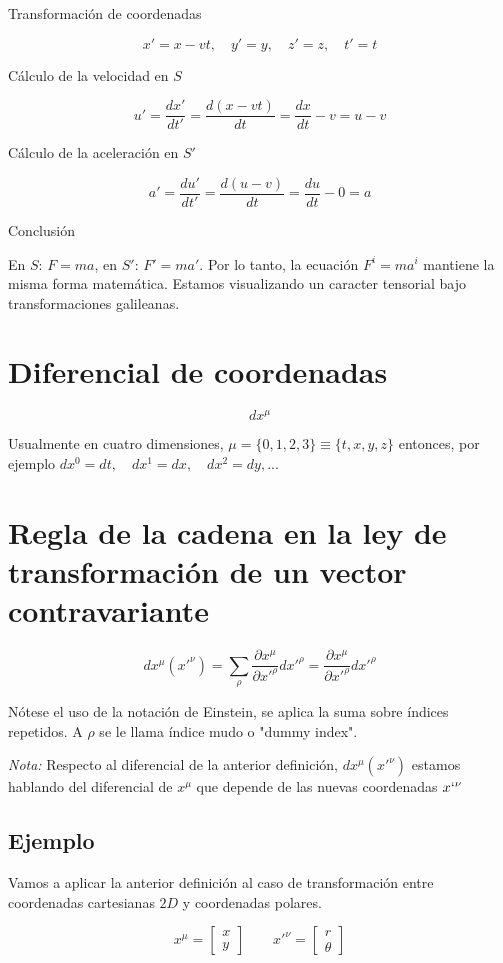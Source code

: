 \documentclass[a4paper]{article}
\begin{document}
Transformación de coordenadas
	
$$x'=x-vt,\quad y' = y, \quad z' = z, \quad t' = t$$
	
Cálculo de la velocidad en $S$

$$u' = \frac{dx'}{dt'} = \frac{d(x-vt)}{dt} = \frac{dx}{dt}-v = u-v$$

Cálculo de la aceleración en $S'$

$$a' = \frac{du'}{dt'} = \frac{d(u-v)}{dt} = \frac{du}{dt}-0 = a$$


Conclusión

En $S$: $F=ma$, en $S'$: $F'=ma'$. Por lo tanto, la ecuación $F^{i}=ma^{i}$ mantiene la misma forma matemática. Estamos visualizando un caracter tensorial bajo transformaciones galileanas.

\section{Diferencial de coordenadas}

$$dx^{\mu}$$

Usualmente en cuatro dimensiones, $\mu = \{0,1,2,3\}\equiv \{t, x, y, z\}$ entonces, por ejemplo $dx^0=dt,\quad dx^1=dx, \quad dx^2=dy,...$

\section{Regla de la cadena en la ley de transformación de un vector contravariante}

$$dx^{\mu}(x'^{\nu}) = \sum_{\rho} \frac{\partial x^{\mu}}{\partial x'^{\rho}}dx'^{\rho} = \frac{\partial x^{\mu}}{\partial x'^{\rho}}dx'^{\rho}$$


Nótese el uso de la notación de Einstein, se aplica la suma sobre índices repetidos. A $\rho$ se le llama índice mudo o "dummy index".

\textit{Nota:} Respecto al diferencial de la anterior definición, $dx^{\mu}(x'^{\nu})$ estamos hablando del diferencial de $x^{\mu}$ que depende de las nuevas coordenadas $x`^{\nu}$

\subsection{Ejemplo}

Vamos a aplicar la anterior definición al caso de transformación entre coordenadas cartesianas $2D$ y coordenadas polares.

$$x^{\mu} = \begin{bmatrix} x \\ y \end{bmatrix}\quad \quad x'^{\nu} = \begin{bmatrix} r \\ \theta \end{bmatrix}$$
\end{document}
